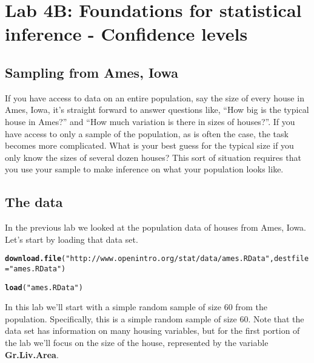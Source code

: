 \documentclass{article}\usepackage[]{graphicx}\usepackage[]{color}
\makeatletter
\newcommand{\hlstr}[1]{\textcolor[rgb]{0.192,0.494,0.8}{#1}}%
\newcommand{\hlstd}[1]{\textcolor[rgb]{0.345,0.345,0.345}{#1}}%
\newcommand{\hlkwc}[1]{\textcolor[rgb]{0.333,0.667,0.333}{#1}}%
\newcommand{\hlkwd}[1]{\textcolor[rgb]{0.737,0.353,0.396}{\textbf{#1}}}%
\newenvironment{kframe}{%
 \def\at@end@of@kframe{}%
 \ifinner\ifhmode%
  \def\at@end@of@kframe{\end{minipage}}%
  \begin{minipage}{\columnwidth}%
 \fi\fi%
 \def\FrameCommand##1{\hskip\@totalleftmargin \hskip-\fboxsep
 \colorbox{shadecolor}{##1}\hskip-\fboxsep
     \hskip-\linewidth \hskip-\@totalleftmargin \hskip\columnwidth}%
 \MakeFramed {\advance\hsize-\width
   \@totalleftmargin\z@ \linewidth\hsize
   \@setminipage}}%
 {\par\unskip\endMakeFramed%
 \at@end@of@kframe}
\newenvironment{knitrout}{}{} %
\makeatother
\begin{document}

\section*{Lab 4B: Foundations for statistical inference - Confidence levels}

\subsection*{Sampling from Ames, Iowa}

If you have access to data on an entire population, say the size of every house in Ames, Iowa, it's straight forward to answer questions like, ``How big is the typical house in Ames?'' and ``How much variation is there in sizes of houses?''. If you have access to only a sample of the population, as is often the case, the task becomes more complicated. What is your best guess for the typical size if you only know the sizes of several dozen houses? This sort of situation requires that you use your sample to make inference on what your population looks like.

\subsection*{The data}

In the previous lab we looked at the population data of houses from Ames, Iowa. Let's start by loading that data set.

\begin{knitrout}
\color{fgcolor}\begin{kframe}
\begin{alltt}
\hlkwd{download.file}\hlstd{(}\hlstr{"http://www.openintro.org/stat/data/ames.RData"}\hlstd{,} \hlkwc{destfile} \hlstd{=} \hlstr{"ames.RData"}\hlstd{)}

\hlkwd{load}\hlstd{(}\hlstr{"ames.RData"}\hlstd{)}
\end{alltt}
\end{kframe}
\end{knitrout}


In this lab we'll start with a simple random sample of size 60 from the population. Specifically, this is a simple random sample of size 60. Note that the data set has information on many housing variables, but for the first portion of the lab we'll focus on the size of the house, represented by the variable \hlkwd{Gr.Liv.Area}.
\end{document}
